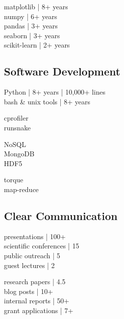\documentclass[]{winter-resume-openfont}
\begin{document}
\begin{minipage}[t]{0.3\textwidth}
\textbullet{} matplotlib | 8+ years \\ 
\textbullet{} numpy | 6+ years \\ 
\textbullet{} pandas | 3+ years \\ 
\textbullet{} seaborn | 3+ years \\
\textbullet{} scikit-learn | 2+ years \\
\sectionsep
\sectionsep
\sectionsep


\subsection{Software Development}
\sectionsep

\textbullet{} Python | 8+ years | 10,000+ lines\\
\textbullet{}  bash \& unix tools | 8+ years \\
 \sectionsep

\textbullet{} cprofiler \\ 
\textbullet{} runsnake \\ 
\sectionsep

\textbullet{} NoSQL \\  
\textbullet{} MongoDB \\
\textbullet{} HDF5 \\ 
\sectionsep

\textbullet{} torque \\
\textbullet{} map-reduce \\

\sectionsep
\sectionsep
\sectionsep

\subsection{Clear Communication}
\sectionsep

\textbullet{} presentations | 100+  \\
\textbullet{} scientific conferences | 15 \\
\textbullet{} public outreach | 5 \\
\textbullet{} guest lectures | 2\\
\sectionsep

\textbullet{} research papers | 4.5\\
\textbullet{} blog posts | 10+\\ 
\textbullet{} internal reports | 50+\\
\textbullet{} grant applications | 7+ \\


\end{minipage}
\end{document}
